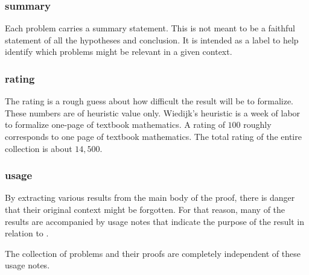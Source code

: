 \subsubsection{summary}

Each problem carries a summary statement. This is not meant to be a faithful statement
of all the hypotheses and conclusion.  It is intended as a label to help identify which
problems might be relevant in a given context.

\subsubsection{rating}

The rating is a rough guess about how difficult the result will be to formalize.   These numbers
are of heuristic value only.  Wiedijk's heuristic
is a week of labor to formalize one-page of textbook mathematics.  A rating of $100$ roughly corresponds
to one page of textbook mathematics.   The total rating of the entire collection is about $14,500$.


\subsubsection{usage}

By extracting various results from the main body of the proof,
there is danger that their original context might be forgotten.
For that reason, many of the results are accompanied by usage
notes that indicate the purpose of the result in relation to \cite{DCG}.

The collection of problems and their proofs are completely independent
of these usage notes.   


